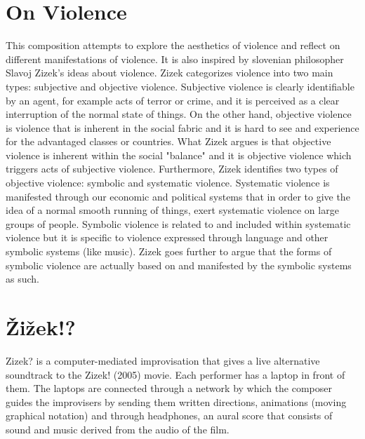 


\section{On Violence}

This composition attempts to explore the aesthetics of violence and reflect on different manifestations of violence. It is also inspired by slovenian philosopher Slavoj Zizek's ideas about violence. Zizek  categorizes violence into two main types: subjective and objective violence. Subjective violence is clearly identifiable by an agent, for example acts of terror or crime, and it is perceived as a clear interruption of the normal state of things. On the other hand, objective violence is  violence that is inherent in the social fabric and it is hard to see and experience for the advantaged classes or countries. What Zizek argues is that objective violence is inherent within the social "balance" and it is objective violence which triggers acts of subjective violence. Furthermore, Zizek identifies two types of objective violence: symbolic and systematic violence. Systematic violence is manifested through our economic and political systems that in order to give the idea of a normal smooth running of things, exert systematic violence on large groups of people. Symbolic violence is related to and included within systematic violence but it is specific to violence expressed through language and other symbolic systems (like music). Zizek goes further to argue that the forms of symbolic violence are actually based on and manifested by the symbolic systems as such. 

\section{\v{Z}i\v{z}ek!?}

Zizek? is a computer-mediated improvisation that gives a live alternative soundtrack to the Zizek! (2005) movie. Each performer has a laptop in front of them. The laptops are connected through a network by which the composer guides the improvisers by sending them written directions, animations (moving graphical notation) and through headphones, an aural score that consists of sound and music derived from the audio of the film. 

